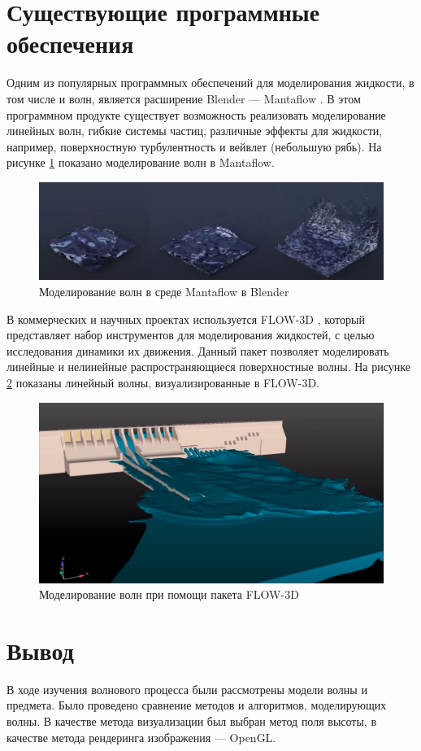 \section{Существующие программные \newline обеспечения}

Одним из популярных программных обеспечений для моделирования жидкости, в том числе и волн, является расширение Blender \cite{blender} --- Mantaflow \cite{mantaflow}. В этом программном продукте существует возможность реализовать моделирование линейных волн, гибкие системы частиц, различные эффекты для жидкости, например, поверхностную турбулентность и вейвлет (небольшую рябь). На рисунке \ref{img:mantaflow} показано моделирование волн в Mantaflow. 

\begin{figure}[H]
	\begin{center}
		\includegraphics[scale=0.2]{img/mantaflow.png}
	\end{center}
	\captionsetup{justification=centering}
	\caption{Моделирование волн в среде Mantaflow в Blender}
	\label{img:mantaflow}
\end{figure}

В коммерческих и научных проектах используется FLOW-3D \cite{flow-3d}, который представляет набор инструментов для моделирования жидкостей, с целью исследования динамики их движения. Данный пакет позволяет моделировать линейные и нелинейные распространяющиеся поверхностные волны. На рисунке \ref{img:flow-3d} показаны линейный волны, визуализированные в FLOW-3D.

\begin{figure}[H]
	\begin{center}
		\includegraphics[scale=0.2]{img/flow-3d.png}
	\end{center}
	\captionsetup{justification=centering}
	\caption{Моделирование волн при помощи пакета FLOW-3D}
	\label{img:flow-3d}
\end{figure}

\section*{Вывод}

В ходе изучения волнового процесса были рассмотрены модели волны и предмета. Было проведено сравнение методов и алгоритмов, моделирующих волны. В качестве метода визуализации был выбран метод поля высоты, в качестве метода рендеринга изображения --- OpenGL.